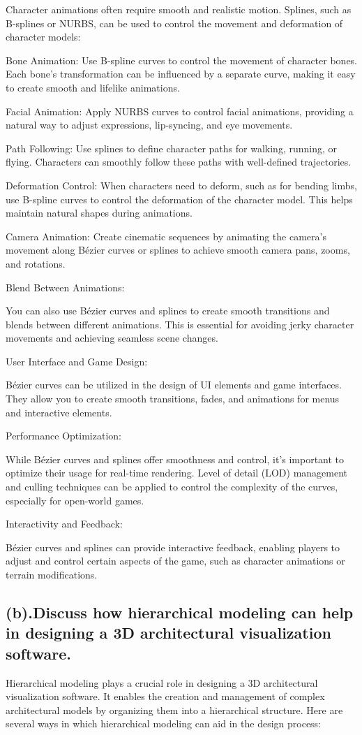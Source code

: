 \documentclass{article}
\begin{document}
\begin{itemize}
Character animations often require smooth and realistic motion. Splines, such as B-splines or NURBS, can be used to control the movement and deformation of character models:

Bone Animation: Use B-spline curves to control the movement of character bones. Each bone's transformation can be influenced by a separate curve, making it easy to create smooth and lifelike animations.

Facial Animation: Apply NURBS curves to control facial animations, providing a natural way to adjust expressions, lip-syncing, and eye movements.

Path Following: Use splines to define character paths for walking, running, or flying. Characters can smoothly follow these paths with well-defined trajectories.

Deformation Control: When characters need to deform, such as for bending limbs, use B-spline curves to control the deformation of the character model. This helps maintain natural shapes during animations.

Camera Animation: Create cinematic sequences by animating the camera's movement along Bézier curves or splines to achieve smooth camera pans, zooms, and rotations.

Blend Between Animations:

You can also use Bézier curves and splines to create smooth transitions and blends between different animations. This is essential for avoiding jerky character movements and achieving seamless scene changes.

User Interface and Game Design:

Bézier curves can be utilized in the design of UI elements and game interfaces. They allow you to create smooth transitions, fades, and animations for menus and interactive elements.

Performance Optimization:

While Bézier curves and splines offer smoothness and control, it's important to optimize their usage for real-time rendering. Level of detail (LOD) management and culling techniques can be applied to control the complexity of the curves, especially for open-world games.

Interactivity and Feedback:

Bézier curves and splines can provide interactive feedback, enabling players to adjust and control certain aspects of the game, such as character animations or terrain modifications.
\subsection{(b).Discuss how hierarchical modeling can help in designing a 3D architectural visualization software.}
Hierarchical modeling plays a crucial role in designing a 3D architectural visualization software. It enables the creation and management of complex architectural models by organizing them into a hierarchical structure. Here are several ways in which hierarchical modeling can aid in the design process:


\end{itemize}
\end{document}
